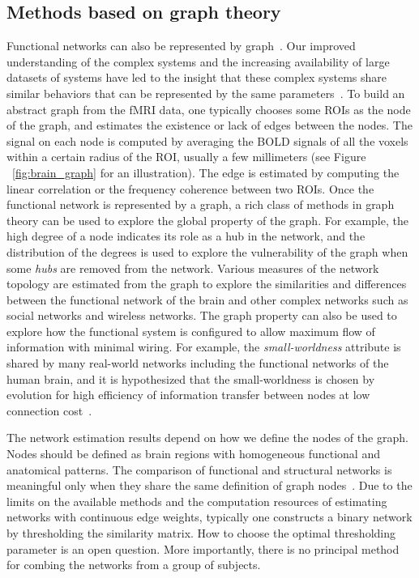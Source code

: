 \subsection{Methods based on graph theory}
Functional networks can also be represented by graph~\cite{bullmore2009complex,
  achard2006resilient, sporns2004organization}. Our improved understanding of
the complex systems and the increasing availability of large datasets of systems
have led to the insight that these complex systems share similar behaviors that
can be represented by the same parameters~\cite{bullmore2009complex}. To build
an abstract graph from the fMRI data, one typically chooses some ROIs as the
node of the graph, and estimates the existence or lack of edges between the
nodes. The signal on each node is computed by averaging the BOLD signals of all
the voxels within a certain radius of the ROI, usually a few millimeters (see
Figure ~\ref{fig:brain_graph} for an illustration). The edge is estimated by
computing the linear correlation or the frequency coherence between two
ROIs. Once the functional network is represented by a graph, a rich class of
methods in graph theory can be used to explore the global property of the
graph. For example, the high degree of a node indicates its role as a hub in the
network, and the distribution of the degrees is used to explore the
vulnerability of the graph when some \emph{hubs} are removed from the
network. Various measures of the network topology are estimated from the graph
to explore the similarities and differences between the functional network of
the brain and other complex networks such as social networks and wireless
networks. The graph property can also be used to explore how the functional
system is configured to allow maximum flow of information with minimal
wiring. For example, the \emph{small-worldness} attribute is shared by many
real-world networks including the functional networks of the human brain, and it is
hypothesized that the small-worldness is chosen by evolution for high efficiency
of information transfer between nodes at low connection
cost~\cite{achard2006resilient, bullmore2009complex, bullmore2012economy}.

The network estimation results depend on how we define the nodes of the
graph. Nodes should be defined as  brain regions with homogeneous functional
and anatomical patterns. The comparison of functional and structural networks is
meaningful only when they share the same definition of graph
nodes~\cite{rubinov2010complex}. Due to the limits on the available methods and
the computation resources of estimating networks with continuous edge weights,
typically one constructs a binary network by thresholding the similarity
matrix. How to choose the optimal thresholding parameter is an open
question. More importantly, there is no principal method for combing the
networks from a group of subjects.

